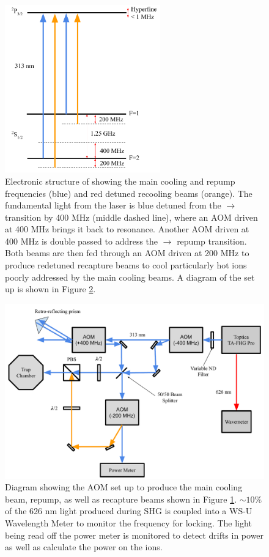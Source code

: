 \begin{figure}
	\centering
	\includegraphics[width=0.6\textwidth]{images/Be_cooling_lasers.pdf}
	\caption{Electronic structure of  showing the main cooling and repump frequencies (blue) and red detuned recooling beams (orange). The fundamental light from the laser is blue detuned from the $\rightarrow$ transition by 400 MHz (middle dashed line), where an AOM driven at 400 MHz brings it back to resonance. Another AOM driven at 400 MHz is double passed to address the $\rightarrow$ repump transition. Both beams are then fed through an AOM driven at 200 MHz to produce redetuned recapture beams to cool particularly hot  ions poorly addressed by the main cooling beams. A diagram of the set up is shown in Figure \ref{fig: AOMs}.}
	\label{fig: Be structure}
\end{figure}

\begin{figure}
	\centering
	\includegraphics[width=\textwidth]{images/AOMs.pdf}
	\caption{Diagram showing the AOM set up to produce the main cooling beam, repump, as well as recapture beams shown in Figure \ref{fig: Be structure}. $\sim 10\%$ of the  626 nm light produced during SHG is coupled into a WS-U Wavelength Meter to monitor the frequency for locking. The light being read off the power meter is monitored to detect drifts in power as well as calculate the power on the ions.}
	\label{fig: AOMs}
\end{figure}